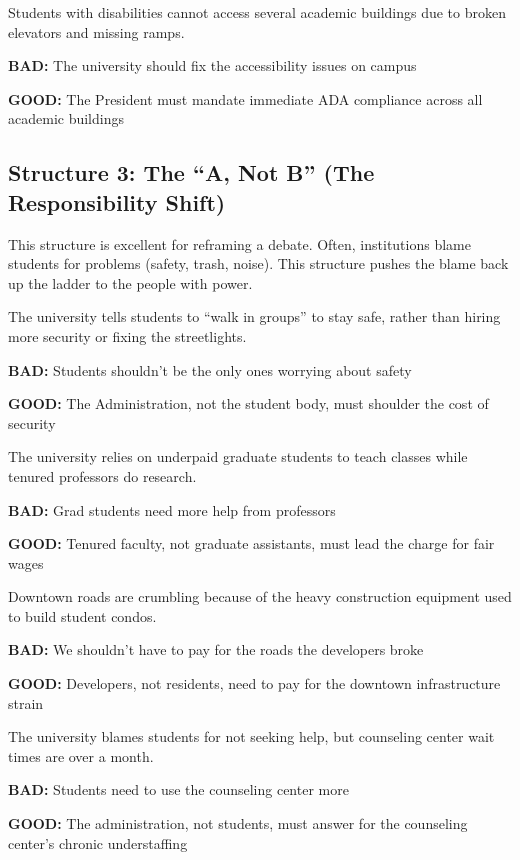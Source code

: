 \documentclass[12pt]{article}
\newcommand{\bad}[1]{\textbf{\textcolor{rose}{BAD:}} #1}
\newcommand{\good}[1]{\textbf{\textcolor{congaree}{GOOD:}} #1}
\newcommand{\context}[1]{#1}
\begin{document}
\begin{exampleblock}
\context{Students with disabilities cannot access several academic buildings due to broken elevators and missing ramps.}

\bad{The university should fix the accessibility issues on campus}

\good{The President must mandate immediate ADA compliance across all academic buildings}
\end{exampleblock}

\newpage
\subsection{Structure 3: The ``A, Not B'' (The Responsibility Shift)}
This structure is excellent for reframing a debate. Often, institutions blame students for problems (safety, trash, noise). This structure pushes the blame back up the ladder to the people with power.

\begin{exampleblock}
\context{The university tells students to ``walk in groups'' to stay safe, rather than hiring more security or fixing the streetlights.}

\bad{Students shouldn't be the only ones worrying about safety}

\good{The Administration, not the student body, must shoulder the cost of security}
\end{exampleblock}

\begin{exampleblock}
\context{The university relies on underpaid graduate students to teach classes while tenured professors do research.}

\bad{Grad students need more help from professors}

\good{Tenured faculty, not graduate assistants, must lead the charge for fair wages}
\end{exampleblock}

\begin{exampleblock}
\context{Downtown roads are crumbling because of the heavy construction equipment used to build student condos.}

\bad{We shouldn't have to pay for the roads the developers broke}

\good{Developers, not residents, need to pay for the downtown infrastructure strain}
\end{exampleblock}

\begin{exampleblock}
\context{The university blames students for not seeking help, but counseling center wait times are over a month.}

\bad{Students need to use the counseling center more}

\good{The administration, not students, must answer for the counseling center's chronic understaffing}
\end{exampleblock}
\end{document}
